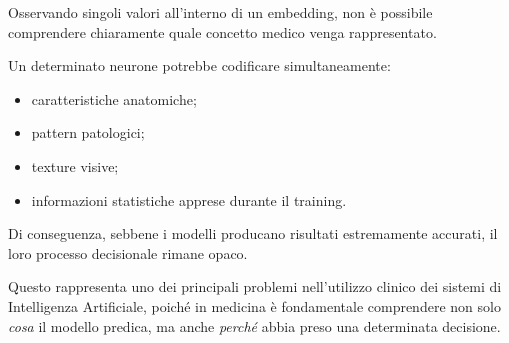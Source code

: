 Osservando singoli valori all'interno di un embedding, non è possibile comprendere chiaramente quale concetto medico venga rappresentato.

Un determinato neurone potrebbe codificare simultaneamente:

\begin{itemize}
    \item caratteristiche anatomiche;
    \item pattern patologici;
    \item texture visive;
    \item informazioni statistiche apprese durante il training.
\end{itemize}

Di conseguenza, sebbene i modelli producano risultati estremamente accurati, il loro processo decisionale rimane opaco.

Questo rappresenta uno dei principali problemi nell'utilizzo clinico dei sistemi di Intelligenza Artificiale, poiché in medicina è fondamentale comprendere non solo \textit{cosa} il modello predica, ma anche \textit{perché} abbia preso una determinata decisione.